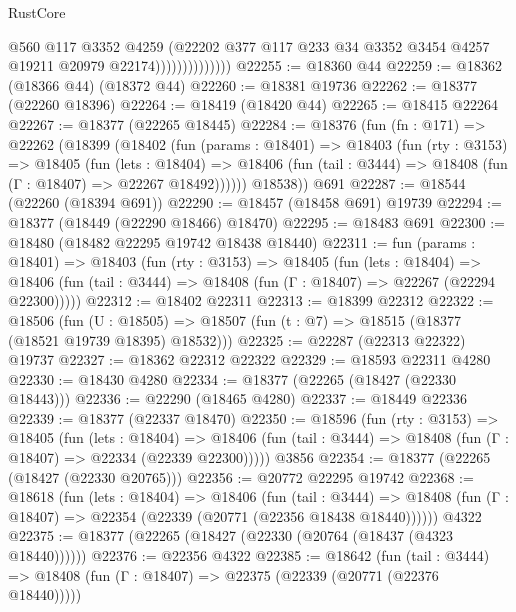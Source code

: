 \begin{lexlean}{RustCore}
\begin{coremodule}
                              @560
                              @117
                              @3352
                              @4259
                              (@22202
                                @377
                                @117
                                @233
                                @34
                                @3352
                                @3454
                                @4257
                                @19211
                                @20979
                                @22174))))))))))))))
@22255 := @18360 @44
@22259 := @18362 (@18366 @44) (@18372 @44)
@22260 := @18381 @19736
@22262 := @18377 (@22260 @18396)
@22264 := @18419 (@18420 @44)
@22265 := @18415 @22264
@22267 := @18377 (@22265 @18445)
@22284 := @18376
    (fun (fn : @171) =>
    @22262
      (@18399
        (@18402
          (fun (params : @18401) =>
          @18403
            (fun (rty : @3153) =>
            @18405
              (fun (lets : @18404) =>
              @18406 (fun (tail : @3444) => @18408 (fun (Γ : @18407) => @22267 @18492))))))
        @18538))
    @691
@22287 := @18544 (@22260 (@18394 @691))
@22290 := @18457 (@18458 @691) @19739
@22294 := @18377 (@18449 (@22290 @18466) @18470)
@22295 := @18483 @691
@22300 := @18480 (@18482 @22295 @19742 @18438 @18440)
@22311 := fun (params : @18401) =>
  @18403
    (fun (rty : @3153) =>
    @18405
      (fun (lets : @18404) =>
      @18406 (fun (tail : @3444) => @18408 (fun (Γ : @18407) => @22267 (@22294 @22300)))))
@22312 := @18402 @22311
@22313 := @18399 @22312
@22322 := @18506
    (fun (U : @18505) => @18507 (fun (t : @7) => @18515 (@18377 (@18521 @19739 @18395) @18532)))
@22325 := @22287 (@22313 @22322) @19737
@22327 := @18362 @22312 @22322
@22329 := @18593 @22311 @4280
@22330 := @18430 @4280
@22334 := @18377 (@22265 (@18427 (@22330 @18443)))
@22336 := @22290 (@18465 @4280)
@22337 := @18449 @22336
@22339 := @18377 (@22337 @18470)
@22350 := @18596
    (fun (rty : @3153) =>
    @18405
      (fun (lets : @18404) =>
      @18406 (fun (tail : @3444) => @18408 (fun (Γ : @18407) => @22334 (@22339 @22300)))))
    @3856
@22354 := @18377 (@22265 (@18427 (@22330 @20765)))
@22356 := @20772 @22295 @19742
@22368 := @18618
    (fun (lets : @18404) =>
    @18406
      (fun (tail : @3444) =>
      @18408 (fun (Γ : @18407) => @22354 (@22339 (@20771 (@22356 @18438 @18440))))))
    @4322
@22375 := @18377 (@22265 (@18427 (@22330 (@20764 (@18437 (@4323 @18440))))))
@22376 := @22356 @4322
@22385 := @18642
    (fun (tail : @3444) => @18408 (fun (Γ : @18407) => @22375 (@22339 (@20771 (@22376 @18440)))))

\end{coremodule}
\end{lexlean}
